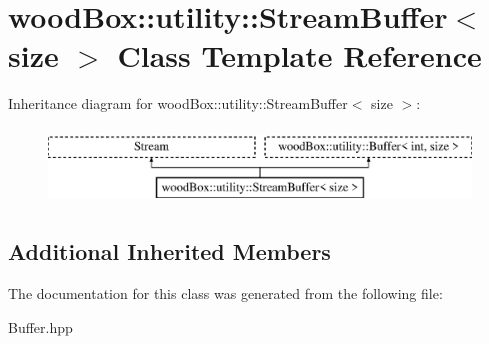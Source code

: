 \hypertarget{classwood_box_1_1utility_1_1_stream_buffer}{}\section{wood\+Box\+:\+:utility\+:\+:Stream\+Buffer$<$ size $>$ Class Template Reference}
\label{classwood_box_1_1utility_1_1_stream_buffer}
Inheritance diagram for wood\+Box\+:\+:utility\+:\+:Stream\+Buffer$<$ size $>$\+:\begin{figure}[H]
\begin{center}
\leavevmode
\includegraphics[height=2.000000cm]{classwood_box_1_1utility_1_1_stream_buffer}
\end{center}
\end{figure}
\subsection*{Additional Inherited Members}


The documentation for this class was generated from the following file\+:\begin{DoxyCompactItemize}
\item 
Buffer.\+hpp\end{DoxyCompactItemize}
